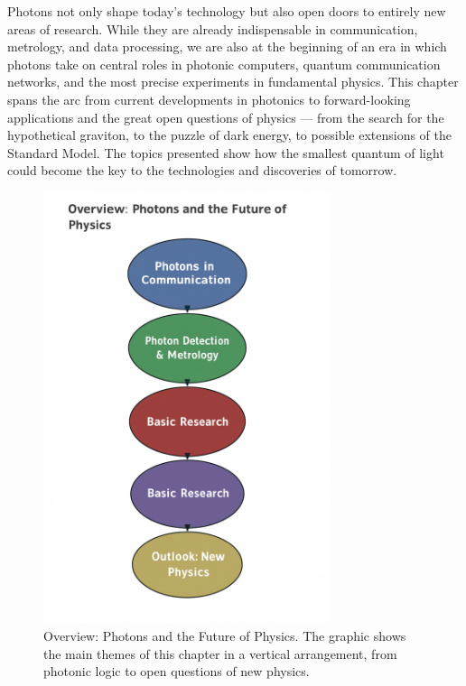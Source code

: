 Photons not only shape today’s technology but also open doors to entirely new areas of research.  
While they are already indispensable in communication, metrology, and data processing, we are also at the beginning of an era in which photons take on central roles in photonic computers, quantum communication networks, and the most precise experiments in fundamental physics.  
This chapter spans the arc from current developments in photonics to forward-looking applications and the great open questions of physics — from the search for the hypothetical graviton, to the puzzle of dark energy, to possible extensions of the Standard Model.  
The topics presented show how the smallest quantum of light could become the key to the technologies and discoveries of tomorrow.
\newpage
\noindent
\begin{figure}[H]
	\centering
	\includegraphics[width=0.75\textwidth]{bilder/kapitel_VII_overview.png}
	\caption[Overview Chapter~VII]{Overview: Photons and the Future of Physics. 
		The graphic shows the main themes of this chapter in a vertical arrangement, 
		from photonic logic to open questions of new physics.}
	\label{fig:kapitel_VII_uebersicht}
\end{figure}

